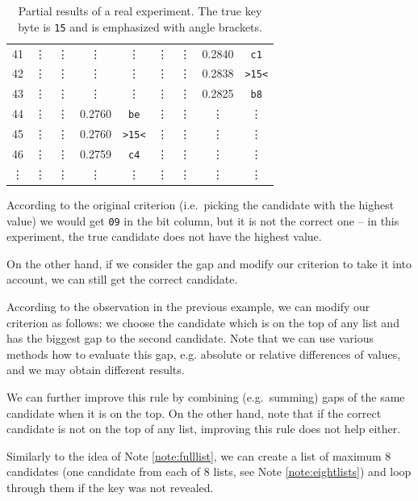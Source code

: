 \begin{example}
\begin{table}[H]
\begin{center}
\begin{tabular}{| c | c | c | c | c | c | c | c | c |}
					41     & \vdots & \vdots     & \vdots & \vdots     & \vdots & \vdots     & 0.2840 & {\tt c1}   \\
					42     & \vdots & \vdots     & \vdots & \vdots     & \vdots & \vdots     & 0.2838 & {\tt >15<} \\
					43     & \vdots & \vdots     & \vdots & \vdots     & \vdots & \vdots     & 0.2825 & {\tt b8}   \\
					44     & \vdots & \vdots     & 0.2760 & {\tt be}   & \vdots & \vdots     & \vdots & \vdots     \\
					45     & \vdots & \vdots     & 0.2760 & {\tt >15<} & \vdots & \vdots     & \vdots & \vdots     \\
					46     & \vdots & \vdots     & 0.2759 & {\tt c4}   & \vdots & \vdots     & \vdots & \vdots     \\
					\vdots & \vdots & \vdots     & \vdots & \vdots     & \vdots & \vdots     & \vdots & \vdots     \\
				\hline
			\end{tabular}
			\end{center}
		\caption{Partial results of a real experiment. The true key byte is {\tt 15} and is emphasized with angle brackets.}
		\label{tab:gap}
		\end{table}
		According to the original criterion (i.e.\ picking the candidate with the highest value) we would get {\tt 09} in the  bit column, but it is not the correct one -- in this experiment, the true candidate does not have the highest value.
		
		On the other hand, if we consider the gap and modify our criterion to take it into account, we can still get the correct candidate.
	\end{example}
	
	\begin{remark}
	\label{rem:gap}
		According to the observation in the previous example, we can modify our criterion as follows: we choose the candidate which is on the top of any list and has the biggest gap to the second candidate. Note that we can use various methods how to evaluate this gap, e.g. absolute or relative differences of values, and we may obtain different results.
		
		We can further improve this rule by combining (e.g.\ summing) gaps of the same candidate when it is on the top. On the other hand, note that if the correct candidate is not on the top of any list, improving this rule does not help either.
		
		Similarly to the idea of Note \ref{note:fulllist}, we can create a list of maximum $8$ candidates (one candidate from each of $8$ lists, see Note \ref{note:eightlists}) and loop through them if the key was not revealed.
	\end{remark}
	
